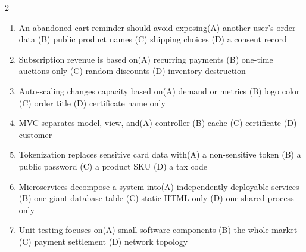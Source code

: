 \documentclass[a4paper]{article}
\begin{document}
\begin{multicols*}{2}
\begin{enumerate}[resume]
\item An abandoned cart reminder should avoid exposing\newline\hspace*{0.6em}(A) another user's order data \quad (B) public product names \newline\hspace*{0.6em}(C) shipping choices \quad (D) a consent record
\item Subscription revenue is based on\newline\hspace*{0.6em}(A) recurring payments \quad (B) one-time auctions only \newline\hspace*{0.6em}(C) random discounts \quad (D) inventory destruction
\item Auto-scaling changes capacity based on\newline\hspace*{0.6em}(A) demand or metrics \quad (B) logo color \newline\hspace*{0.6em}(C) order title \quad (D) certificate name only
\item MVC separates model, view, and\newline\hspace*{0.6em}(A) controller \quad (B) cache \newline\hspace*{0.6em}(C) certificate \quad (D) customer
\item Tokenization replaces sensitive card data with\newline\hspace*{0.6em}(A) a non-sensitive token \quad (B) a public password \newline\hspace*{0.6em}(C) a product SKU \quad (D) a tax code
\item Microservices decompose a system into\newline\hspace*{0.6em}(A) independently deployable services \quad (B) one giant database table \newline\hspace*{0.6em}(C) static HTML only \quad (D) one shared process only
\item Unit testing focuses on\newline\hspace*{0.6em}(A) small software components \quad (B) the whole market \newline\hspace*{0.6em}(C) payment settlement \quad (D) network topology

\end{enumerate}
\end{multicols*}
\end{document}
